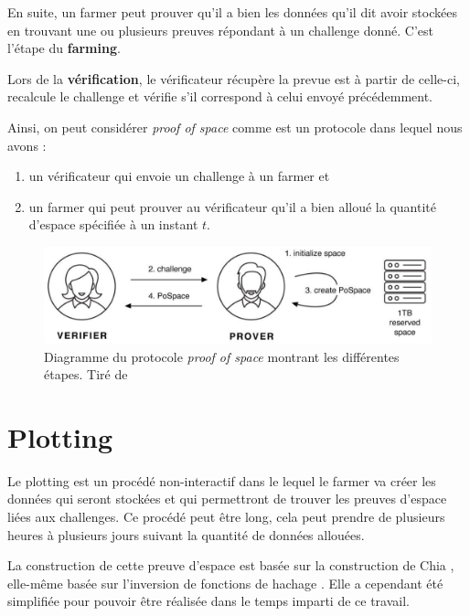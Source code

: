 En suite, un farmer peut prouver qu'il a bien les données qu'il dit avoir stockées en trouvant une ou plusieurs preuves répondant à un challenge donné. C'est l'étape du \textbf{farming}.

Lors de la \textbf{vérification}, le vérificateur récupère la prevue est à partir de celle-ci, recalcule le challenge et vérifie s'il correspond à celui envoyé précédemment.

Ainsi, on peut considérer \emph{proof of space} comme est un protocole dans lequel nous avons :

\begin{enumerate}
  \item un vérificateur qui envoie un challenge à un farmer et
  \item un farmer qui peut prouver au vérificateur qu'il a bien alloué la quantité d'espace spécifiée à un instant $t$.
\end{enumerate}

\begin{figure}[H]
  \centering
  \includegraphics[width=\textwidth]{images/pospace.png}
  \caption{Diagramme du protocole \emph{proof of space} montrant les différentes étapes. Tiré de \cite{chia:consensus}}
\end{figure}

\section{Plotting}

Le plotting est un procédé non-interactif dans le lequel le farmer va créer les données qui seront stockées et qui permettront de trouver les preuves d'espace liées aux challenges. Ce procédé peut être long, cela peut prendre de plusieurs heures à plusieurs jours suivant la quantité de données allouées.

La construction de cette preuve d'espace est basée sur la construction de Chia \cite{chia:construction}, elle-même basée sur l'inversion de fonctions de hachage \cite{DBLP:conf/asiacrypt/AbusalahACKPR17}. Elle a cependant été simplifiée pour pouvoir être réalisée dans le temps imparti de ce travail. 

